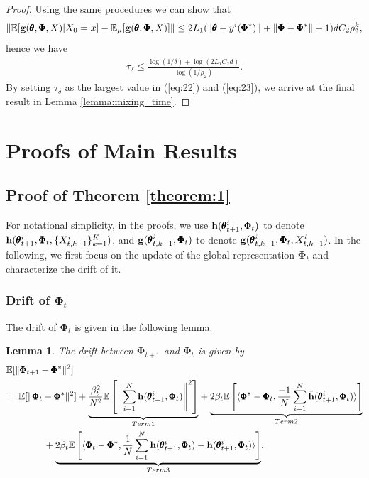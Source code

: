 \documentclass{article} %
\def\eqref#1{equation~\ref{#1}}
\theoremstyle{plain}
\newtheorem{lemma}[theorem]{Lemma}
\theoremstyle{definition}
\theoremstyle{remark}
\renewcommand{\eqref}[1]{(\ref{#1})}
\begin{document}
{\begin{proof}
Using the same procedures we can show that 
 \begin{align*}
     \|\mathbb{E}[{\mathbf{g}}( \pmb{\theta}, \pmb{\Phi}, X)|X_0=x]-\mathbb{E}_\mu[{\mathbf{g}}( \pmb{\theta}, \pmb{\Phi}, X)]\|\leq 2L_1(\|\pmb{\theta}-y^i(\pmb{\Phi}^*)\|+\|\pmb{\Phi}-\pmb{\Phi}^*\|+1)dC_2\rho_2^k,
\end{align*}
hence we have 
\begin{align}\label{eq:23}
   \tau_\delta\leq \frac{\log(1/\delta)+\log(2L_1C_2d)}{\log(1/\rho_2)}. 
\end{align}
By setting $\tau_\delta$ as the largest value in \eqref{eq:22} and \eqref{eq:23}, we arrive at the final result in Lemma  \ref{lemma:mixing_time}.
\end{proof}






\section{Proofs of Main Results}\label{sec:proof}


\subsection{Proof of Theorem \ref{theorem:1}}
For notational simplicity, in the proofs, we use $\mathbf{h}(\pmb{\theta}_{t+1}^i, \pmb{\Phi}_t)$ to denote
$\mathbf{h}(\pmb{\theta}_{t+1}^i, \pmb{\Phi}_t, \{X_{t,k-1}^i\}_{k=1}^K)$, and ${\mathbf{g}}(\pmb{\theta}_{t, k-1}^i, \pmb{\Phi}_t)$ to denote ${\mathbf{g}}(\pmb{\theta}_{t, k-1}^i, \pmb{\Phi}_t, X_{t,k-1}^i)$. In the following, we first focus on the update of the global representation $\pmb{\Phi}_t$ and characterize the drift of it. 

\subsubsection{Drift of $\pmb{\Phi}_t$}\label{sec:phi_drift}
The drift of $\pmb{\Phi}_t$ is given in the following lemma. 
\begin{lemma}\label{lem:dfrit_phi}
The drift between $\pmb{\Phi}_{t+1}$ and $\pmb{\Phi}_t$ is given by 
\begin{align}
    &\mathbb{E}[\|\pmb{\Phi}_{t+1}-\pmb{\Phi}^*\|^2]\nonumber\\
    &=\mathbb{E}[\|\pmb{\Phi}_{t}-\pmb{\Phi}^*\|^2]+\underset{\textnormal{Term 1}}{\underbrace{\frac{\beta_t^2}{N^2}\mathbb{E}\left[\left\|\sum_{i=1}^N\bh(\pmb{\theta}_{t+1}^i, \pmb{\Phi}_t)\right\|^2\right]}}+\underset{\textnormal{Term 2}}{\underbrace{2\beta_t\mathbb{E}\left[\langle\pmb{\Phi}^*-\pmb{\Phi}_t, \frac{-1}{N}\sum_{i=1}^N\bar{\bh}(\pmb{\theta}_{t+1}^i,\pmb{\Phi}_t)\rangle\right]}}\nonumber\\
    &\qquad\qquad+\underset{\textnormal{Term 3}}{\underbrace{2\beta_t\mathbb{E}\left[\langle\pmb{\Phi}_t-\pmb{\Phi}^*, \frac{1}{N}\sum_{i=1}^N\bh(\pmb{\theta}_{t+1}^i, \pmb{\Phi}_t)-\bar{\bh}(\pmb{\theta}_{t+1}^i, \pmb{\Phi}_t)\rangle\right]}}.
\end{align}
\end{lemma}

}
\end{document}

